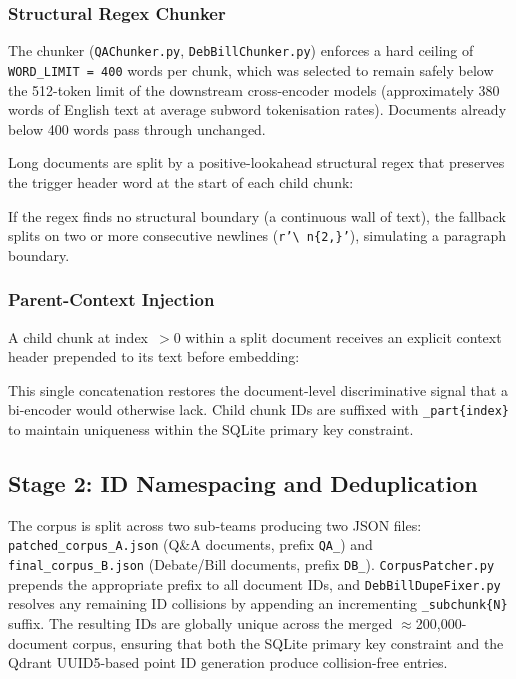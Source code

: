 \documentclass[conference]{IEEEtran}
\begin{document}
\subsubsection{Structural Regex Chunker}

The chunker (\texttt{QAChunker.py}, \texttt{DebBillChunker.py}) enforces a
hard ceiling of \texttt{WORD\_LIMIT = 400} words per chunk, which was
selected to remain safely below the 512-token limit of the downstream
cross-encoder models (approximately 380 words of English text at average
subword tokenisation rates).
Documents already below 400 words pass through unchanged.

Long documents are split by a positive-lookahead structural regex that
preserves the trigger header word at the start of each child chunk:


If the regex finds no structural boundary (a continuous wall of text), the
fallback splits on two or more consecutive newlines (\texttt{r'\textbackslash
n\{2,\}'}), simulating a paragraph boundary.

\subsubsection{Parent-Context Injection}

A child chunk at index~$> 0$ within a split document receives an explicit
context header prepended to its text before embedding:

This single concatenation restores the document-level discriminative signal
that a bi-encoder would otherwise lack.
Child chunk IDs are suffixed with \texttt{\_part\{index\}} to maintain
uniqueness within the SQLite primary key constraint.

\subsection{Stage 2: ID Namespacing and Deduplication}

The corpus is split across two sub-teams producing two JSON files:
\texttt{patched\_corpus\_A.json} (Q\&A documents, prefix \texttt{QA\_}) and
\texttt{final\_corpus\_B.json} (Debate/Bill documents, prefix \texttt{DB\_}).
\texttt{CorpusPatcher.py} prepends the appropriate prefix to all document
IDs, and \texttt{DebBillDupeFixer.py} resolves any remaining ID collisions
by appending an incrementing \texttt{\_subchunk\{N\}} suffix.
The resulting IDs are globally unique across the merged $\approx$200,000-document
corpus, ensuring that both the SQLite primary key constraint and the Qdrant
UUID5-based point ID generation produce collision-free entries.
\end{document}
